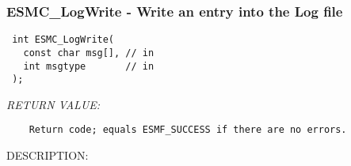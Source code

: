  
\setlength{\oldparskip}{\parskip}
\setlength{\parskip}{1.5ex}
\setlength{\oldparindent}{\parindent}
\setlength{\parindent}{0pt}
\setlength{\oldbaselineskip}{\baselineskip}
\setlength{\baselineskip}{11pt}
 
\def\bv{\begin{verbatim}}
\def\ev{\end{verbatim}}
\def\be{\begin{equation}}
\def\ee{\end{equation}}
\def\bea{\begin{eqnarray}}
\def\eea{\end{eqnarray}}
\def\bi{\begin{itemize}}
\def\ei{\end{itemize}}
\def\bn{\begin{enumerate}}
\def\en{\end{enumerate}}
\def\bd{\begin{description}}
\def\ed{\end{description}}
\def\({\left (}
\def\){\right )}
\def\[{\left [}
\def\]{\right ]}
\def\<{\left  \langle}
\def\>{\right \rangle}
\def\cI{{\cal I}}
\def\diag{\mathop{\rm diag}}
\def\tr{\mathop{\rm tr}}


 
\subsubsection [ESMC\_LogWrite] {ESMC\_LogWrite - Write an entry into the Log file}


  
\begin{verbatim} int ESMC_LogWrite(
   const char msg[], // in
   int msgtype       // in
 );\end{verbatim}{\em RETURN VALUE:}
\begin{verbatim}    Return code; equals ESMF_SUCCESS if there are no errors.\end{verbatim}
{\sf DESCRIPTION:\\ }


